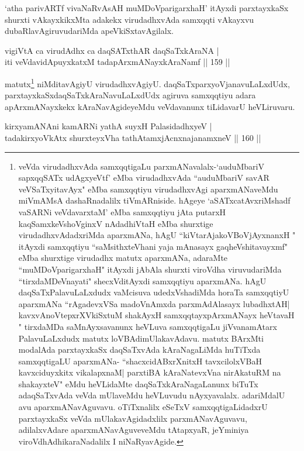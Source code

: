 \begin{artha}
`atha parivARTf vivaNaRvAsAH muMDoV\s parigarxhaH' itAyxdi parxtayxkaSx shurxti vAkayxkikxMta adakekx virudadhxvAda samxqqti vAkayxvu dubaRlavAgiruvudariMda apeVkiSxtavAgilalx.
\end{artha}

\begin{shl}
vigiVtA ca virudAdhx ca daqSATxthAR daqSaTxkAraNA |\\
iti veVdavidA\s puyxkatxM tadapArxmANayxkAraNamf \hfill || 159 ||
\end{shl}

\begin{artha}
matutx\footnote{veVda virudadhxvAda samxqqtigaLu parxmANavalalx-`auduMbariV sapxqqSATx udAgxyeVtf' eMba virudadhxvAda ``auduMbariV savAR veVSaTxyitavAyx" eMba samxqqtiyu virudadhxvAgi aparxmANaveMdu miVmAMsA dashaRnadalilx tiVmARniside. hAgeye `aSATxcatAvxriMshadf vaSARNi veVdavarxtaM' eMba samxqqtiyu jAta putarxH kaqSamxkeVshoV\s ginxV nAdadhiVtaH eMba shurxtige virudadhxvAdadxriMda aparxmANa, hAgU ``kiVtarAjakoV\s BoVjAyxnanxH " itAyxdi samxqqtiyu ``saMsithxteV\s hani yaja mAnasayx gaqheV\s shitavayxmf" eMba shurxtige virudadhx matutx aparxmANa, adaraMte ``muMDoV\s parigarxhaH" itAyxdi jAbAla shurxti viroVdha viruvudariMda ``tirxdaMDeVnayati" shecxVditAyxdi samxqqtiyu aparxmANa. hAgU daqSaTxPalavuLaLxdudx vaMcisuva udedxVshadiMda horaTa samxqqtiyU aparxmANa ``rAgadevxVSa madoVnAmxda parxmAdAlasayx lubadhxtAH| kavxvAnoVtepxrXVkiSxtuM shakAyxH samxqqtayxpArxmANayx heVtavaH " tirxdaMDa saMnAyxsavanunx heVLuva samxqqtigaLu jiVvanamAtarx PalavuLaLxdudx matutx loVBAdimUlakavAdavu. matutx BArxMti modalAda parxtayxkaSx daqSaTxvAda kAraNagaLiMda huTiTxda samxqqtigaLU aparxmANa- ``shacxcidABxrXnitxH tavxcilolxVBaH kavxciduyxkitx vikalapxnaM| parxtiBA kAraNatevxVna nirAkatuRM na shakayxteV" eMdu heVLidaMte daqSaTxkAraNagaLanunx biTuTx adaqSaTxvAda veVda mUlaveMdu heVLuvudu nAyxyavalalx. adariMdalU avu aparxmANavAguvavu. oTiTxnalilx eSeTxV samxqqtigaLidadxrU parxtayxkaSx veVda mUlakavAgidadxlilx parxmANavAguvavu, adilalxvAdare aparxmANavAguveveMdu tAtapxyaR, jeYminiya viroVdhAdhikaraNadalilx I niNaRyavAgide.} niMditavAgiyU virudadhxvAgiyU. daqSaTxparxyoVjanavuLaLxdUdx, parxtayxkaSxdaqSaTxkAraNavuLaLxdUdx agiruva samxqqtiyu adara apArxmANayxkekx kAraNavAgideyeMdu veVdavanunx tiLidavarU heVLiruvaru.
\end{artha}

\begin{shl}
kirxyamANAni kamARNi yathA suyxH PalasidadhxyeV |\\
tadakirxyoVkAtx shurxteyxVha tathA\s \s tamxjAcnxnajanamxneV \hfill || 160 ||
\end{shl}	

